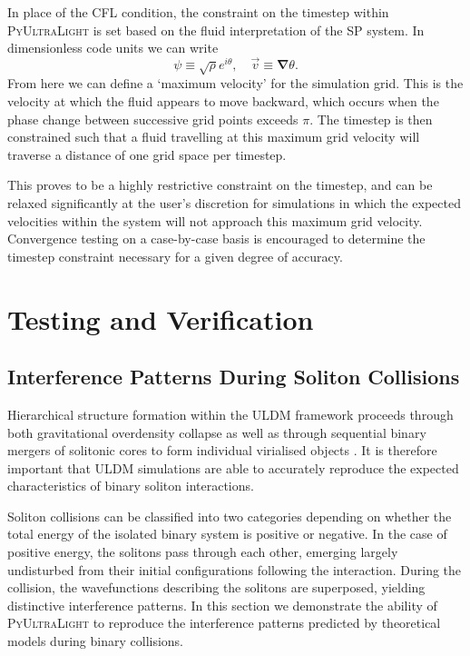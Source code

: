 \documentclass[a4paper,11pt]{article}
\newcommand{\PyUltraLight}{\textsc{PyUltraLight }}
\begin{document}
In place of the CFL condition, the constraint on the timestep within \PyUltraLight is set based on the fluid interpretation of the SP system. In dimensionless code units we can write 
\begin{equation}
    \psi\equiv\sqrt{\rho}e^{i\theta}, \quad \vec{v}\equiv\boldsymbol{\nabla}\theta.
\end{equation}
From here we can define a `maximum velocity' for the simulation grid. This is the velocity at which the fluid appears to move backward, which occurs when the phase change between successive grid points exceeds $\pi$. The timestep is then constrained such that a fluid travelling at this maximum grid velocity will traverse a distance of one grid space per timestep.

This proves to be a highly restrictive constraint on the timestep, and can be relaxed significantly at the user's discretion for simulations in which the expected velocities within the system will not approach this maximum grid velocity. Convergence testing on a case-by-case basis is encouraged to determine the timestep constraint necessary for a given degree of accuracy. 


\section{Testing and Verification}\label{sec:test}

\subsection{Interference Patterns During Soliton Collisions}\label{sec:interference}

Hierarchical structure formation within the ULDM framework proceeds through both gravitational overdensity collapse as well as through sequential binary mergers of solitonic cores to form individual virialised objects \cite{Schive2014}. It is therefore important that ULDM simulations are able to accurately reproduce the expected characteristics of binary soliton interactions. 

Soliton collisions can be classified into two categories depending on whether the total energy of the isolated binary system is positive or negative. In the case of positive energy, the solitons pass through each other, emerging largely undisturbed from their initial configurations following the interaction. During the collision, the wavefunctions describing the solitons are superposed, yielding distinctive interference patterns. In this section we demonstrate the ability of \PyUltraLight to reproduce the interference patterns predicted by theoretical models during binary collisions. 
\end{document}
